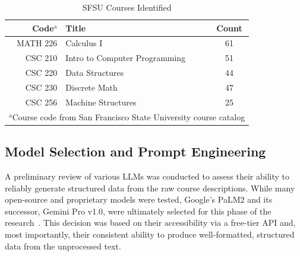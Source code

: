 \begin{table}[tb]
    \captionsetup{skip=5pt}
    \centering
    \caption{SFSU Courses Identified}
    \begin{tabular}{rlc}
        \toprule
        \textbf{Code$^{\mathrm{a}}$} & \textbf{Title}                & \textbf{Count} \\
        \midrule
        MATH 226                     & Calculus I
                                        & 61                                             \\
        CSC 210                      & Intro to Computer Programming
                                        & 51                                             \\
        CSC 220                      & Data Structures
                                        & 44                                             \\
        CSC 230                      & Discrete Math
                                        & 47                                             \\
        CSC 256                      & Machine Structures
                                        & 25                                             \\
        \bottomrule
        \multicolumn{3}{l}{$^{\mathrm{a}}$Course code from San Francisco
            State University course catalog}
    \end{tabular}
    \label{tbl:sfsucourses}
\end{table}

\subsection{Model Selection and Prompt Engineering}\label{ch:3.1.2}
A preliminary review of various LLMs was conducted to assess their ability to reliably generate structured data from the raw course descriptions. While many open-source and proprietary models were tested, Google's PaLM2 and its successor, Gemini Pro v1.0, were ultimately selected for this phase of the research~\cite{google_palm,google_gemini}. This decision was based on their accessibility via a free-tier API and, most importantly, their consistent ability to produce well-formatted, structured data from the unprocessed text.

